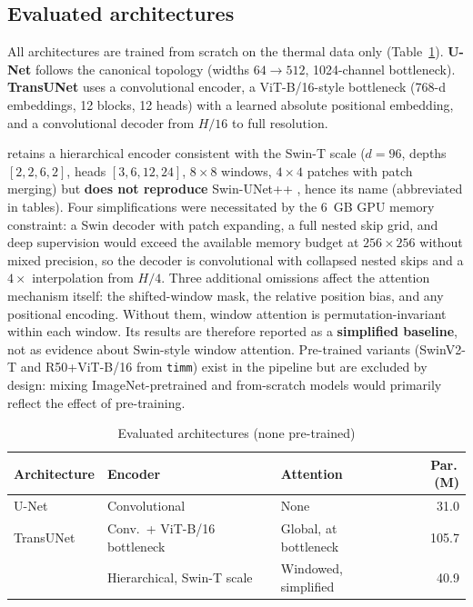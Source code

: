\subsection{Evaluated architectures} \label{sec:arquiteturas_avaliadas}

All architectures are trained from scratch on the thermal data only (Table~\ref{tab:arquiteturas}).
\textbf{U-Net} \cite{Ronneberger2015} follows the canonical topology (widths $64\!\rightarrow\!512$, 1024-channel bottleneck).
\textbf{TransUNet} \cite{Chen2021} uses a convolutional encoder, a ViT-B/16-style bottleneck (768-d embeddings, 12 blocks, 12 heads) with a learned absolute positional embedding, and a convolutional decoder from $H/16$ to full resolution.

\textbf{\swinp{}} retains a hierarchical encoder consistent with the Swin-T scale \cite{Liu2021Swin} ($d{=}96$, depths $[2,2,6,2]$, heads $[3,6,12,24]$, $8\times8$ windows, $4\times4$ patches with patch merging) but \textbf{does not reproduce} Swin-UNet++ \cite{Liu2021Materials}, hence its name (abbreviated \swint{} in tables).
Four simplifications were necessitated by the 6~GB GPU memory constraint: a Swin decoder with patch expanding, a full nested skip grid, and deep supervision would exceed the available memory budget at $256\times256$ without mixed precision, so the decoder is convolutional with collapsed nested skips and a $4\times$ interpolation from $H/4$.
Three additional omissions affect the attention mechanism itself: the shifted-window mask, the relative position bias, and any positional encoding.
Without them, window attention is permutation-invariant within each window.
Its results are therefore reported as a \textbf{simplified baseline}, not as evidence about Swin-style window attention.
Pre-trained variants (SwinV2-T and R50+ViT-B/16 from \texttt{timm}) exist in the pipeline but are excluded by design: mixing ImageNet-pretrained and from-scratch models would primarily reflect the effect of pre-training.

\begin{table}[tbp]
\centering
\caption{Evaluated architectures (none pre-trained)}
\label{tab:arquiteturas}
\footnotesize
\setlength{\tabcolsep}{3pt}
\begin{tabular}{@{}>{\raggedright\arraybackslash}p{1.55cm}>{\raggedright\arraybackslash}p{2.75cm}>{\raggedright\arraybackslash}p{2.35cm}r@{}}
\toprule
\textbf{Architecture} & \textbf{Encoder} & \textbf{Attention} & \textbf{Par.\,(M)} \\
\midrule
U-Net & Convolutional & None & 31.0 \\
TransUNet & Conv.\ + ViT-B/16 bottleneck & Global, at bottleneck & 105.7 \\
\swint{} & Hierarchical, Swin-T scale & Windowed, simplified & 40.9 \\
\bottomrule
\end{tabular}
\end{table}

